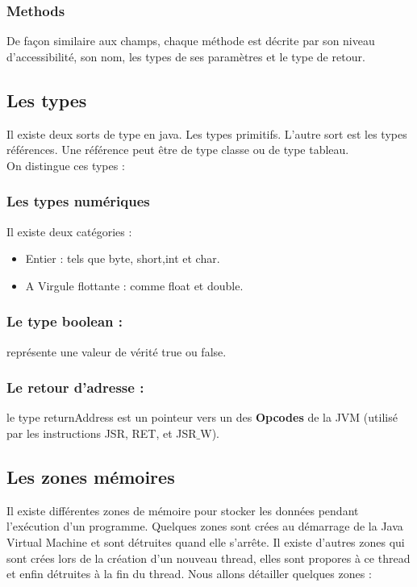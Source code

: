 \documentclass[12pt, a4paper, one side]{article}
\begin{document}
    \subsubsection{Methods}
    De façon similaire aux champs, chaque méthode est décrite par son niveau d'accessibilité, son nom, les types de ses paramètres et le type de retour.

    \subsection{Les types}
    Il existe deux sorts de type en java. Les types primitifs. L'autre sort est les types références. Une référence peut être de type classe ou de type tableau.
    \\

    On distingue ces types :
    \subsubsection{Les types numériques}
    Il existe deux catégories :
    \begin{itemize}
        \item Entier : tels que byte, short,int et char.
        \item A Virgule flottante : comme float et double.
    \end{itemize}

    \subsubsection{Le type boolean : } représente une valeur de vérité true ou false.
    \subsubsection{Le retour d'adresse : } le type returnAddress est un pointeur vers
    un des \textbf{Opcodes} de la JVM (utilisé par les instructions JSR, RET, et JSR$\_$W).

    \subsection{Les zones mémoires \cite{ref_zones_memeoire_java}}
    Il existe différentes zones de mémoire pour stocker les données pendant l'exécution d'un programme. Quelques zones sont crées au démarrage de la Java Virtual Machine et sont détruites quand elle s'arrête. Il existe d'autres zones qui sont crées lors de la création d'un nouveau thread, elles sont propores à ce thread et enfin détruites à la fin du thread.
    Nous allons détailler quelques zones :
\end{document}

